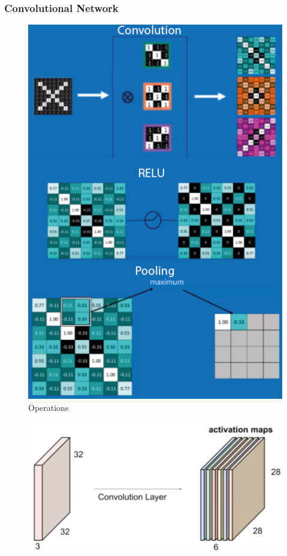 \documentclass[10pt]{article}
\begin{document}
\subsubsection{Convolutional Network}
\begin{minipage}[t]{0.5\textwidth}
\begin{figure}[H]
  	\centering
    \includegraphics[scale=0.8]{Convolutional.PNG}
    \caption{Operations \cite{ConvolutionalNetwork}}
\end{figure}
\end{minipage}\begin{minipage}[t]{0.5\textwidth}
\begin{figure}[H]
  	\centering
    \includegraphics[scale=0.4]{ActivationMap.PNG}

\end{figure}
\end{minipage}
\end{document}
